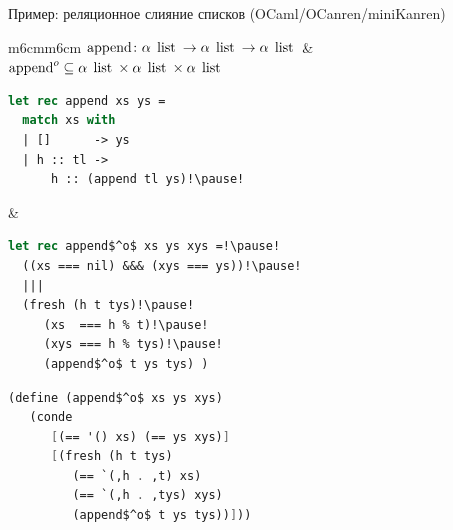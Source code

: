 \documentclass[10pt, mathserif]{beamer}
\let\\\tabularnewline
\let\\\tabularnewline
\newcommand{\oo}[1]{{#1}^o}
\newcommand{\inml}[1]{\mbox{\lstinline{#1}}}
\newcommand{\graybox}[1]{\colorbox{light-gray}{#1}}
\theoremstyle{definition}
\begin{document}
\begin{frame}[fragile]{Пример: реляционное слияние списков (OCaml/OCanren/miniKanren)}
\begin{adjustwidth}{-1.5em}{-1.5em}
\begin{tabular}{m{6cm}m{6cm}}
 \graybox{$\inml{append} \colon \alpha\:\inml{list} \to \alpha\:\inml{list} \to \alpha\:\inml{list}$} &
 \graybox{$\oo{\inml{append}}\subseteq\alpha\:\inml{list}\times\alpha\:\inml{list}\times\alpha\:\inml{list}$}\\
 \begin{lstlisting}[language=ocaml,keywordstyle=\bfseries]
let rec append xs ys =
  match xs with
  | []      -> ys
  | h :: tl ->
      h :: (append tl ys)!\pause!
 \end{lstlisting} &
 \begin{lstlisting}[mathescape=true,language=ocaml]
let rec append$^o$ xs ys xys =!\pause!
  ((xs === nil) &&& (xys === ys))!\pause!
  |||
  (fresh (h t tys)!\pause!
     (xs  === h % t)!\pause!
     (xys === h % tys)!\pause!
     (append$^o$ t ys tys) )
 \end{lstlisting}
\end{tabular}\pause
\begin{center}
\begin{minipage}{6cm}
\begin{lstlisting}[mathescape=true,language=scheme]
(define (append$^o$ xs ys xys)
   (conde
      [(== '() xs) (== ys xys)]
      [(fresh (h t tys)
         (== `(,h . ,t) xs)
         (== `(,h . ,tys) xys)
         (append$^o$ t ys tys))]))
\end{lstlisting}
\end{minipage}
\end{center}

\end{adjustwidth}
\vskip5mm
\end{frame}
\end{document}
